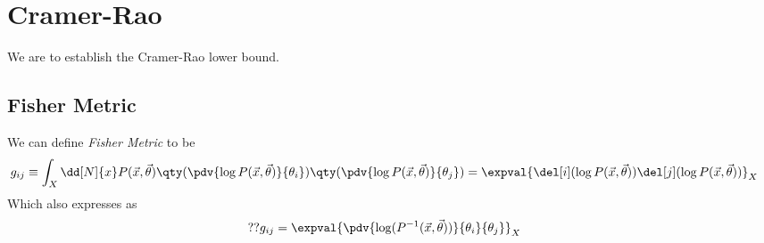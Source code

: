 \section*
{Cramer-Rao}

We are to establish 
the Cramer-Rao lower bound. 

\subsection* 
{Fisher Metric}

We can define 
\textit{Fisher Metric} to be 
\begin{align*}
    g_{ij} 
& \equiv  
    \int_{X}
    \dd[N]{x} 
    P(\Vec{x}, \Vec{\theta})
    \qty 
    (
        \pdv 
        {\log P(\Vec{x},
        \Vec{\theta})}
        {\theta_{i}}
    )
    \qty 
    (
        \pdv 
        {\log P(\Vec{x},
        \Vec{\theta})}
        {\theta_{j}}
    )
=
    \expval
    {
        \del[i] 
        (\log 
        P(\Vec{x},
        \Vec{\theta}))
        \del[j] 
        (\log 
        P(\Vec{x},
        \Vec{\theta}))
    }_{X}
\end{align*}
Which also expresses as
\begin{align*}
??
    g_{ij}
& =
    \expval
    {
        \pdv 
        { \log 
          ( P^{-1} ( 
          \Vec{x}, \Vec{\theta}
          ))
        }
        { \theta_{i} } 
        { \theta_{j} }
    }_{X}  
\end{align*}

